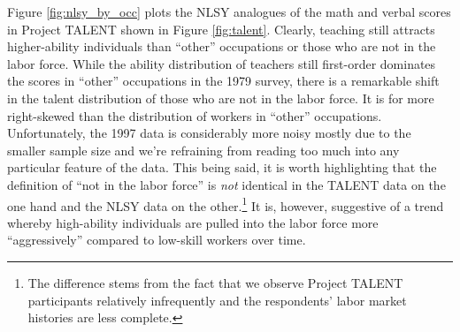 \documentclass[onehalfspacing,11pt]{article}
\begin{document}
Figure \ref{fig:nlsy_by_occ} plots the NLSY analogues of the math and verbal scores in Project TALENT shown in Figure \ref{fig:talent}. Clearly, teaching still attracts higher-ability individuals than ``other'' occupations or those who are not in the labor force. While the ability distribution of teachers still first-order dominates the scores in ``other'' occupations in the 1979 survey, there is a remarkable shift in the talent distribution of those who are not in the labor force. It is for more right-skewed than the distribution of workers in ``other'' occupations. Unfortunately, the 1997 data is considerably more noisy mostly due to the smaller sample size and we're refraining from reading too much into any particular feature of the data. This being said, it is worth highlighting that the definition of ``not in the labor force'' is {\it not} identical in the TALENT data on the one hand and the NLSY data on the other.\footnote{The difference stems from the fact that we observe Project TALENT participants relatively infrequently and the respondents' labor market histories are less complete.} It is, however, suggestive of a trend whereby high-ability individuals are pulled into the labor force more ``aggressively'' compared to low-skill workers over time.
\end{document}
